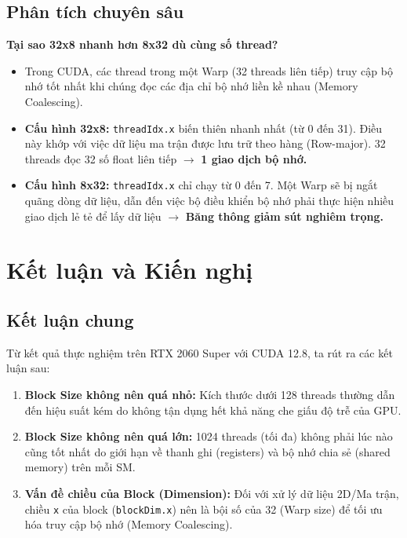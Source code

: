 \documentclass{article}
\begin{document}
    \subsection{Phân tích chuyên sâu}

    \textbf{Tại sao 32x8 nhanh hơn 8x32 dù cùng số thread?}

    \begin{itemize}
        \item Trong CUDA, các thread trong một Warp (32 threads liên tiếp) truy cập bộ nhớ tốt nhất khi chúng đọc các địa chỉ bộ nhớ liền kề nhau (Memory Coalescing).
        \item \textbf{Cấu hình 32x8:} \lstinline|threadIdx.x| biến thiên nhanh nhất (từ 0 đến 31). Điều này khớp với việc dữ liệu ma trận được lưu trữ theo hàng (Row-major). 32 threads đọc 32 số float liên tiếp $\rightarrow$ \textbf{1 giao dịch bộ nhớ.}
        \item \textbf{Cấu hình 8x32:} \lstinline|threadIdx.x| chỉ chạy từ 0 đến 7. Một Warp sẽ bị ngắt quãng dòng dữ liệu, dẫn đến việc bộ điều khiển bộ nhớ phải thực hiện nhiều giao dịch lẻ tẻ để lấy dữ liệu $\rightarrow$ \textbf{Băng thông giảm sút nghiêm trọng.}
    \end{itemize}

    \section{Kết luận và Kiến nghị}

    \subsection{Kết luận chung}

    Từ kết quả thực nghiệm trên RTX 2060 Super với CUDA 12.8, ta rút ra các kết luận sau:

    \begin{enumerate}
        \item \textbf{Block Size không nên quá nhỏ:} Kích thước dưới 128 threads thường dẫn đến hiệu suất kém do không tận dụng hết khả năng che giấu độ trễ của GPU.
        \item \textbf{Block Size không nên quá lớn:} 1024 threads (tối đa) không phải lúc nào cũng tốt nhất do giới hạn về thanh ghi (registers) và bộ nhớ chia sẻ (shared memory) trên mỗi SM.
        \item \textbf{Vấn đề chiều của Block (Dimension):} Đối với xử lý dữ liệu 2D/Ma trận, chiều \lstinline|x| của block (\lstinline|blockDim.x|) nên là bội số của 32 (Warp size) để tối ưu hóa truy cập bộ nhớ (Memory Coalescing).
    \end{enumerate}
\end{document}
